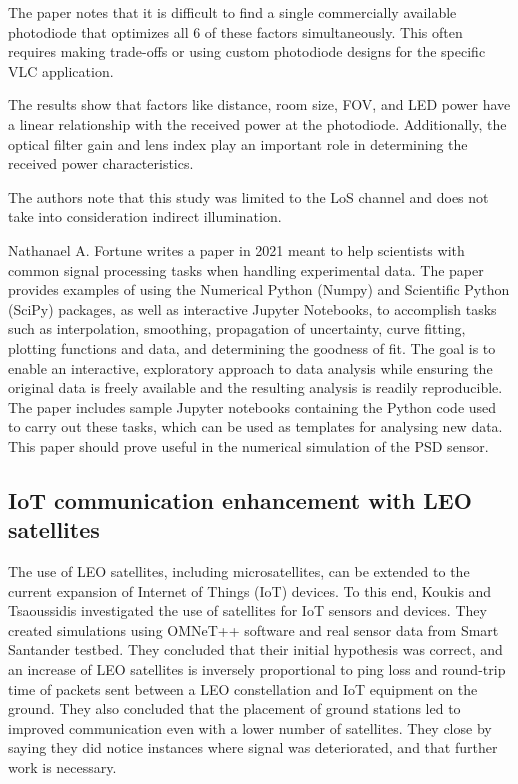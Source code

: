 The paper notes that it is difficult to find a single commercially available photodiode that optimizes all 6 of these factors simultaneously. This often requires making trade-offs or using custom photodiode designs for the specific VLC application.

The results show that factors like distance, room size, FOV, and LED power have a linear relationship with the received power at the photodiode. Additionally, the optical filter gain and lens index play an important role in determining the received power characteristics.

The authors note that this study was limited to the LoS channel and does not take into consideration indirect illumination.

Nathanael A. Fortune writes a paper in 2021 meant to help scientists with common signal processing tasks when handling experimental data. The paper provides examples of using the Numerical Python (Numpy) and Scientific Python (SciPy) packages, as well as interactive Jupyter Notebooks, to accomplish tasks such as interpolation, smoothing, propagation of uncertainty, curve fitting, plotting functions and data, and determining the goodness of fit. The goal is to enable an interactive, exploratory approach to data analysis while ensuring the original data is freely available and the resulting analysis is readily reproducible. The paper includes sample Jupyter notebooks containing the Python code used to carry out these tasks, which can be used as templates for analysing new data. This paper should prove useful in the numerical simulation of the PSD sensor.

\subsection{IoT communication enhancement with LEO satellites}
The use of LEO satellites, including microsatellites, can be extended to the current expansion of Internet of Things (IoT) devices. To this end, Koukis and Tsaoussidis investigated the use of satellites for IoT sensors and devices. They created simulations using OMNeT++ software and real sensor data from Smart Santander testbed. They concluded that their initial hypothesis was correct, and an increase of LEO satellites is inversely proportional to ping loss and round-trip time of packets sent between a LEO constellation and IoT equipment on the ground. They also concluded that the placement of ground stations led to improved communication even with a lower number of satellites. They close by saying they did notice instances where signal was deteriorated, and that further work is necessary.

